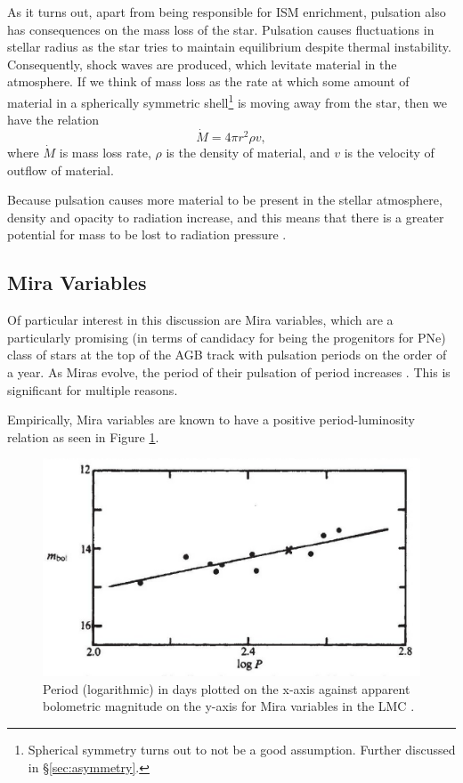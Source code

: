 \documentclass[twocolumn]{aastex63}
\begin{document}
As it turns out, apart from being responsible for ISM enrichment, pulsation also has consequences on the mass loss of the star. Pulsation causes fluctuations in stellar radius as the star tries to maintain equilibrium despite thermal instability. Consequently, shock waves are produced, which levitate material in the atmosphere. If we think of mass loss as the rate at which some amount of material in a spherically symmetric shell\footnote{Spherical symmetry turns out to not be a good assumption. Further discussed in \S \ref{sec:asymmetry}.} is moving away from the star, then we have the relation
\begin{equation}\label{eq:mlshell}
    \dot M = 4\pi r^2 \rho v,
\end{equation}
where $\dot M$ is mass loss rate, $\rho$ is the density of material, and $v$ is the velocity of outflow of material. 

Because pulsation causes more material to be present in the stellar atmosphere, density and opacity to radiation increase, and this means that there is a greater potential for mass to be lost to radiation pressure \citep{liljegren}. 

\subsection{Mira Variables} \label{subsec:mira}

Of particular interest in this discussion are Mira variables, which are a particularly promising (in terms of candidacy for being the progenitors for PNe) class of stars at the top of the AGB track with pulsation periods on the order of a year. As Miras evolve, the period of their pulsation of period increases \citep{fadeyev}. This is significant for multiple reasons. 

Empirically, Mira variables are known to have a positive period-luminosity relation \citep{robertson, glass} as seen in Figure \ref{fig:period_luminosity}.
\begin{figure}[!ht]
    \includegraphics[width=\textwidth]{period_luminosity.png}
    \caption{Period (logarithmic) in days plotted on the x-axis against apparent bolometric magnitude on the y-axis for Mira variables in the LMC \citep{glass}.}
    \label{fig:period_luminosity}
\end{figure}
\end{document}
